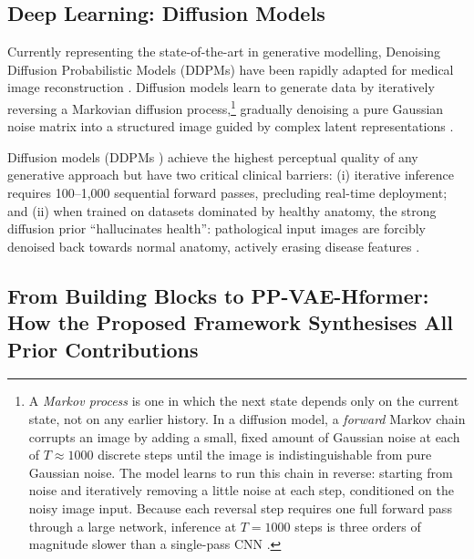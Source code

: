 \documentclass[12pt, a4paper, twoside, openright]{book}
\begin{document}
\subsection{Deep Learning: Diffusion Models}
\label{sec:intro:existing:diffusion}

Currently representing the state-of-the-art in generative modelling, Denoising Diffusion
Probabilistic Models (DDPMs) have been rapidly adapted for medical image reconstruction
\cite{ho_denoising_2020, song_score-based_2021}. Diffusion models learn to generate data
by iteratively reversing a Markovian diffusion process,\footnote{A \emph{Markov process} is one in which the next state depends only on the current state, not on any earlier history. In a diffusion model, a \emph{forward} Markov chain corrupts an image by adding a small, fixed amount of Gaussian noise at each of $T \approx 1000$ discrete steps until the image is indistinguishable from pure Gaussian noise. The model learns to run this chain in reverse: starting from noise and iteratively removing a little noise at each step, conditioned on the noisy image input. Because each reversal step requires one full forward pass through a large network, inference at $T=1000$ steps is three orders of magnitude slower than a single-pass CNN \cite{ho_denoising_2020}.} gradually denoising a pure Gaussian
noise matrix into a structured image guided by complex latent representations
\cite{ho_denoising_2020}.

Diffusion models (DDPMs \cite{ho_denoising_2020}) achieve the highest perceptual quality of any generative approach but have two critical clinical barriers: (i) iterative inference requires 100--1,000 sequential forward passes, precluding real-time deployment; and (ii) when trained on datasets dominated by healthy anatomy, the strong diffusion prior ``hallucinates health'': pathological input images are forcibly denoised back towards normal anatomy, actively erasing disease features \cite{kazerouni_diffusion_2023, pfaff_no-new-denoiser_2024}. 

\subsection{From Building Blocks to PP-VAE-Hformer: How the Proposed Framework Synthesises All Prior Contributions}
\label{sec:intro:existing:synthesis}
\end{document}
